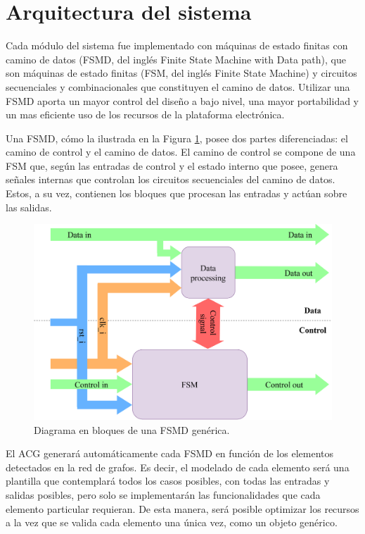 \section{Arquitectura del sistema}

	Cada módulo del sistema fue implementado con máquinas de estado finitas	con camino de datos (FSMD, del inglés Finite State Machine with Data path), que son máquinas de estado finitas (FSM, del inglés Finite State Machine) y circuitos
	secuenciales y combinacionales que constituyen el camino de datos. Utilizar una FSMD aporta un mayor control del diseño a bajo nivel, una mayor portabilidad y un mas eficiente uso de los recursos de la plataforma electrónica.
	
	Una FSMD, cómo la ilustrada en la Figura \ref{fig:FSMD}, posee dos partes diferenciadas: el camino de control y el camino de datos. El camino de control se compone de una FSM que, según las entradas de control y el estado interno que posee, genera señales internas que controlan los circuitos secuenciales del camino de datos. Estos, a su vez, contienen los bloques que procesan las entradas y actúan sobre las salidas.
	
	\begin{figure}[H]
		\centering
		\includegraphics[width=1\textwidth]{Figuras/FSMD.png}
		\centering\caption{Diagrama en bloques  de una FSMD genérica.}
		\label{fig:FSMD}
	\end{figure}
	
	El ACG generará automáticamente cada FSMD en función de los elementos detectados en la red de grafos. Es decir, el modelado de cada elemento será una plantilla que contemplará todos los casos posibles, con todas las entradas y salidas posibles, pero solo se implementarán las funcionalidades que cada elemento particular requieran. De esta manera, será posible optimizar los recursos a la vez que se valida cada elemento una única vez, como un objeto genérico.
	
